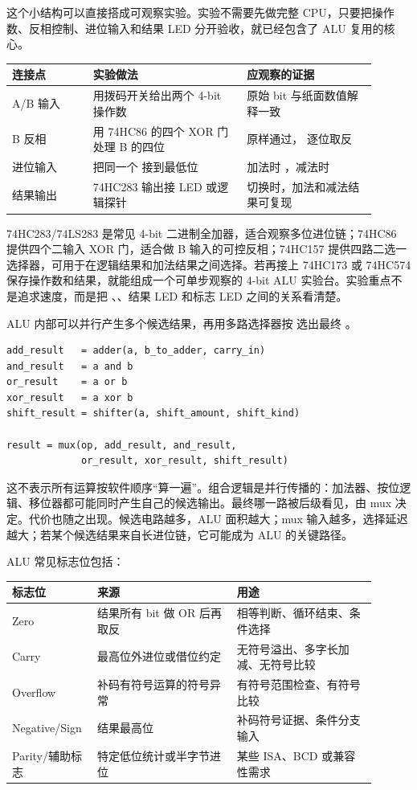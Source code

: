 这个小结构可以直接搭成可观察实验。实验不需要先做完整 CPU，只要把操作数、反相控制、进位输入和结果 LED 分开验收，就已经包含了 ALU 复用的核心。

\begin{longtable}{L{0.2\linewidth}L{0.38\linewidth}L{0.32\linewidth}}
\toprule
连接点 & 实验做法 & 应观察的证据 \\
\midrule
A/B 输入 & 用拨码开关给出两个 4-bit 操作数 & 原始 bit 与纸面数值解释一致 \\
B 反相 & 用 74HC86 的四个 XOR 门处理 B 的四位 &  原样通过， 逐位取反 \\
进位输入 & 把同一个  接到最低位  & 加法时 ，减法时  \\
结果输出 & 74HC283 输出接 LED 或逻辑探针 &  切换时，加法和减法结果可复现 \\
\bottomrule
\end{longtable}

\begin{chipcase}
74HC283/74LS283 是常见 4-bit 二进制全加器，适合观察多位进位链；74HC86 提供四个二输入 XOR 门，适合做 B 输入的可控反相；74HC157 提供四路二选一选择器，可用于在逻辑结果和加法结果之间选择。若再接上 74HC173 或 74HC574 保存操作数和结果，就能组成一个可单步观察的 4-bit ALU 实验台。实验重点不是追求速度，而是把 、、结果 LED 和标志 LED 之间的关系看清楚。
\end{chipcase}

ALU 内部可以并行产生多个候选结果，再用多路选择器按  选出最终 。

\begin{lstlisting}
add_result   = adder(a, b_to_adder, carry_in)
and_result   = a and b
or_result    = a or b
xor_result   = a xor b
shift_result = shifter(a, shift_amount, shift_kind)

result = mux(op, add_result, and_result,
             or_result, xor_result, shift_result)
\end{lstlisting}

这不表示所有运算按软件顺序“算一遍”。组合逻辑是并行传播的：加法器、按位逻辑、移位器都可能同时产生自己的候选输出。最终哪一路被后级看见，由 mux 决定。代价也随之出现。候选电路越多，ALU 面积越大；mux 输入越多，选择延迟越大；若某个候选结果来自长进位链，它可能成为 ALU 的关键路径。

ALU 常见标志位包括：

\begin{longtable}{L{0.18\linewidth}L{0.36\linewidth}L{0.36\linewidth}}
\toprule
标志位 & 来源 & 用途 \\
\midrule
Zero & 结果所有 bit 做 OR 后再取反 & 相等判断、循环结束、条件选择 \\
Carry & 最高位外进位或借位约定 & 无符号溢出、多字长加减、无符号比较 \\
Overflow & 补码有符号运算的符号异常 & 有符号范围检查、有符号比较 \\
Negative/Sign & 结果最高位 & 补码符号证据、条件分支输入 \\
Parity/辅助标志 & 特定低位统计或半字节进位 & 某些 ISA、BCD 或兼容性需求 \\
\bottomrule
\end{longtable}

